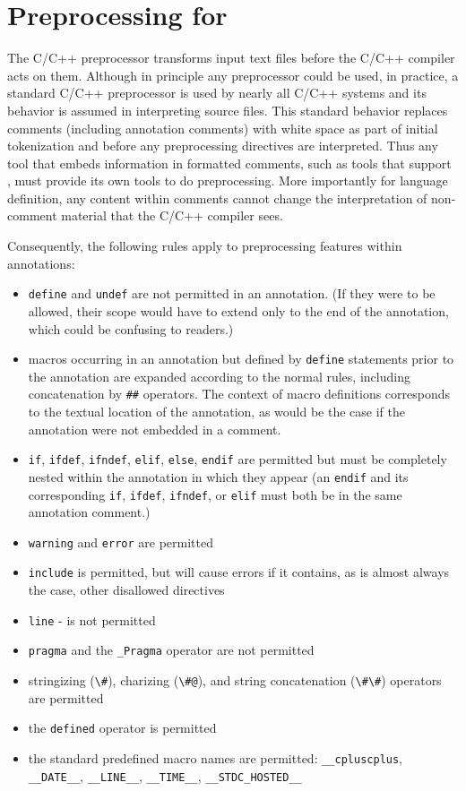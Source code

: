 \section{Preprocessing for \NAME}
\label{sec:ppimpl}

The C/C++ preprocessor transforms input text files before the C/C++ compiler acts on them. 
Although in principle any preprocessor could be used, in practice, a
standard C/C++ preprocessor is used by nearly all C/C++ systems and its behavior is assumed in interpreting source files. 
This standard behavior 
replaces comments (including \NAME annotation comments) with white space as part of initial tokenization and before any preprocessing directives are
interpreted.
Thus any tool that embeds information in formatted comments, such as tools that support \NAME, must provide its own tools to do preprocessing.
More importantly for language definition, any content within comments cannot change the interpretation of non-comment material that the C/C++ compiler sees.

Consequently, the following rules apply to preprocessing features within \NAME annotations:
\begin{itemize}
	\item \texttt{define} and \texttt{undef} are not permitted in an annotation. (If they were to be allowed, their scope would have to extend only to the end of the annotation, which could be confusing to readers.)
	\item macros occurring in an annotation but defined by \texttt{define} statements prior to the annotation are expanded according to the normal rules, including concatenation by \texttt{\#\#} operators. 
	The context of macro definitions corresponds to the textual location of the annotation, as would be the case if the
	annotation were not embedded in a comment.
	\item \texttt{if}, \texttt{ifdef}, \texttt{ifndef}, \texttt{elif}, \texttt{else}, \texttt{endif} are permitted but must be completely nested within the annotation in which they appear (an \texttt{endif} and its corresponding \texttt{if}, \texttt{ifdef}, \texttt{ifndef}, or \texttt{elif} must both be in the same annotation comment.)
	\item \texttt{warning} and \texttt{error} are permitted
	\item \texttt{include} is permitted, but will cause errors if it contains, as is almost always the case, other disallowed directives
	\item \texttt{line} - is not permitted
	\item \texttt{pragma} and the \texttt{\_Pragma} operator are not permitted
	\item stringizing (\verb|\#|), charizing (\verb|\#@|), and string concatenation (\verb|\#\#|) operators are permitted
	\item the \verb|defined| operator is permitted
	\item the standard predefined macro names are permitted: 
	\texttt{\_\_cpluscplus}, 
	\texttt{\_\_DATE\_\_}, 
	\texttt{\_\_LINE\_\_},
    \texttt{\_\_TIME\_\_},
	\texttt{\_\_STDC\_HOSTED\_\_}
\end{itemize}




